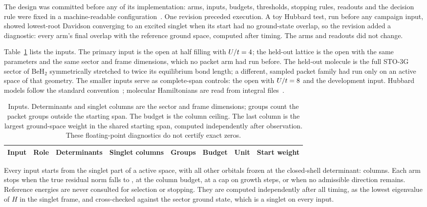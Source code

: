 \documentclass[aps,pra,reprint,superscriptaddress,nofootinbib,floatfix,
  showkeys,raggedbottom]{revtex4-2}
\begin{document}
The design was committed before any of its implementation: arms, inputs,
budgets, thresholds, stopping rules, readouts and the decision rule were fixed
in a machine-readable configuration~\cite{nosek2018preregistration}. One
revision preceded execution. A toy Hubbard test, run before any campaign input,
showed lowest-root Davidson converging to an excited singlet when its start
had no ground-state overlap, so the revision added a diagnostic: every arm's
final overlap with the reference ground space, computed after timing. The
arms and readouts did not change.

Table~\ref{tab:inputs} lists the inputs. The primary input is the open
\pkPrimaryName{} at half filling with $U/t=4$; the
held-out lattice is the open \pkChainName{} with the same parameters and the
same sector and frame dimensions, which no packet arm had run before. The
held-out molecule is the full STO-3G sector of BeH$_2$ symmetrically stretched
to twice its equilibrium bond length; a different, sampled packet family had run only on an active
space of that geometry. The smaller inputs serve as complete-span controls:
the open \pkLadderName{} with $U/t=8$ and the
\pkWaterName{} development input. Hubbard models follow the standard
convention~\cite{hubbard1963electron}; molecular Hamiltonians are read from
integral files~\cite{knowles1989fcidump}.

\begin{table}[t]
\caption{Inputs. Determinants and singlet columns are the sector and frame
dimensions; groups count the packet groups outside the starting span. The
budget is the column ceiling. The last column is the largest ground-space
weight in the shared starting span, computed independently after
observation. These floating-point diagnostics do not certify exact zeros.}
\label{tab:inputs}
\begin{ruledtabular}
\begin{tabular}{llrrrrlr}
Input & Role & Determinants & Singlet columns & Groups & Budget & Unit & Start weight \\
\hline

\end{tabular}
\end{ruledtabular}
\end{table}

Every input starts from the singlet part of a \pkStartSpace{} active space, with
all other orbitals frozen at the closed-shell determinant: \pkStartColumns{}
columns. Each arm stops when the true residual norm falls to
\pkResidualTolerance{}, at the column budget, at a cap on growth steps, or when
no admissible direction remains. Reference energies are never consulted for
selection or stopping. They are computed independently after all timing, as
the lowest eigenvalue of $H$ in the singlet frame, and cross-checked against
the sector ground state, which is a singlet on every input.
\end{document}
